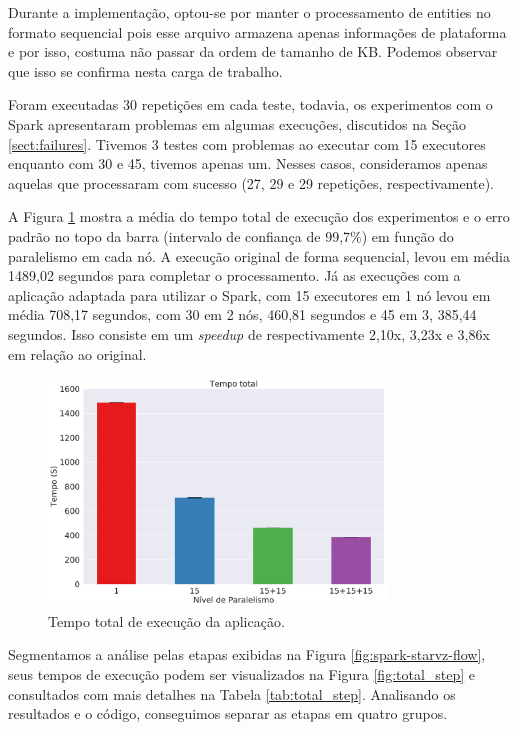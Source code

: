 Durante a implementação, optou-se por manter o processamento de entities
no formato sequencial pois esse arquivo armazena apenas informações de 
plataforma e por isso, costuma não passar da ordem de tamanho de KB. Podemos 
observar que isso se confirma nesta carga de trabalho.

Foram executadas 30 repetições em cada teste, todavia, os experimentos com o 
Spark apresentaram problemas em algumas execuções, discutidos na Seção 
\ref{sect:failures}. Tivemos 3 testes com problemas ao executar com 15 
executores enquanto com 30 e 45, tivemos apenas um. Nesses casos, consideramos 
apenas aquelas que processaram com sucesso (27, 29 e 29 repetições, 
respectivamente). 

A Figura \ref{fig:total_full} mostra a média do tempo total de execução dos 
experimentos e o erro padrão no topo da barra (intervalo de confiança 
de 99,7\%) em função do paralelismo em cada nó. A execução original 
de forma sequencial, levou em média 1489,02 segundos para completar o 
processamento. Já as execuções com a aplicação adaptada para utilizar o Spark, 
com 15 executores em 1 nó levou em média 708,17 segundos, com 30 em 2 nós, 
460,81 segundos e 45 em 3, 385,44 segundos. Isso consiste em um \textit{speedup} 
de respectivamente 2,10x, 3,23x e 3,86x em relação ao original.

\begin{figure}[ht]
\centerline{
\includegraphics[width=0.8\textwidth]{./img/total.pdf}}
 \caption{Tempo total de execução da aplicação.}
 \label{fig:total_full}
\end{figure}


Segmentamos a análise pelas etapas exibidas na Figura 
\ref{fig:spark-starvz-flow}, seus tempos de execução podem ser visualizados na 
Figura \ref{fig:total_step} e consultados com mais detalhes na Tabela 
\ref{tab:total_step}. Analisando os resultados e o código, conseguimos 
separar as etapas em quatro grupos.


